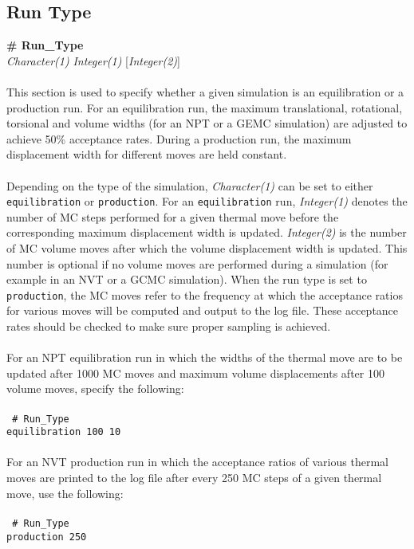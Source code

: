 \subsection{Run Type}\label{sec:Run_Type}
{\bf \# Run\_Type} \\
{\it Character(1)} {\it Integer(1)} [{\it Integer(2)}] \\ \\
%
This section is used to specify whether a given simulation is an equilibration or a production run.
For an equilibration run, the maximum translational, rotational, torsional and volume widths (for an NPT or a GEMC
simulation) are adjusted to achieve 50\% acceptance rates. During a production run, the maximum
displacement width for different moves are held constant. \\ \\
%
Depending on the type of the simulation,
{\it Character(1)} can be set to either \texttt{equilibration} or \texttt{production}.
For an \texttt{equilibration} run, {\it Integer(1)} denotes
the number of MC steps performed for a given thermal move before the corresponding maximum
displacement width is updated. {\it Integer(2)} is the number of MC volume moves after which the volume
displacement width is updated. This number is optional if no volume moves are performed during a simulation (for example in an NVT or
a GCMC simulation). When the run type is set to \texttt{production}, the MC moves refer to the frequency at which the acceptance
ratios for various moves will be computed and output to the log file. These acceptance rates should be checked to make sure proper sampling is achieved. \\ \\
%
For an NPT equilibration run in which the widths of the thermal move are to be updated after 1000 MC moves and
maximum volume displacements after 100 volume moves, specify the following: \\ \\
%
\texttt{
\# Run\_Type \\
equilibration 100 10 \\ \\}
%
%
For an NVT production run in which the acceptance ratios of various thermal moves are printed to the log file after
every 250 MC steps of a given thermal move, use the following: \\ \\
%
\texttt{
\# Run\_Type \\
production 250}
%
%
%
